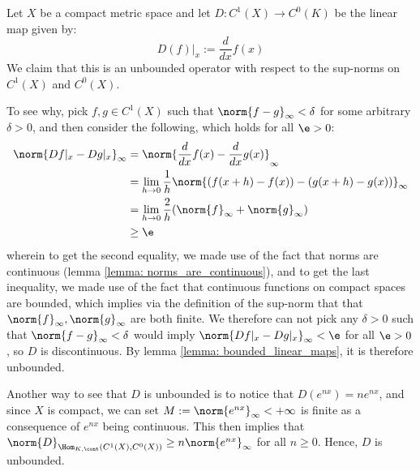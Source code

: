         \begin{example} \label{example: d/dx_is_unbounded}
            Let $X$ be a compact metric space and let $D: C^1(X) \to C^0(K)$ be the linear map given by:
                $$D(f)|_x := \frac{d}{dx} f(x)$$
            We claim that this is an unbounded operator with respect to the sup-norms on $C^1(X)$ and $C^0(X)$.

            To see why, pick $f, g \in C^1(X)$ such that $\norm{f - g}_{\infty} < \delta$ for some arbitrary $\delta > 0$, and then consider the following, which holds for all $\e > 0$:
                $$
                    \begin{aligned}
                        \norm{Df|_x - Dg|_x}_{\infty} & = \norm{ \frac{d}{dx} f(x) - \frac{d}{dx} g(x) }_{\infty}
                        \\
                        & = \lim_{h \to 0} \frac1h \norm{ ( f(x + h) - f(x) ) - ( g(x + h) - g(x) ) }_{\infty}
                        \\
                        & = \lim_{h \to 0} \frac2h ( \norm{f}_{\infty} + \norm{g}_{\infty} )
                        \\
                        & \geq \e
                    \end{aligned}
                $$
            wherein to get the second equality, we made use of the fact that norms are continuous (lemma \ref{lemma: norms_are_continuous}), and to get the last inequality, we made use of the fact that continuous functions on compact spaces are bounded, which implies via the definition of the sup-norm that that $\norm{f}_{\infty}, \norm{g}_{\infty}$ are both finite. We therefore can not pick any $\delta > 0$ such that $\norm{f - g}_{\infty} < \delta$ would imply $\norm{Df|_x - Dg|_x}_{\infty} < \e$ for all $\e > 0$, so $D$ is discontinuous. By lemma \ref{lemma: bounded_linear_maps}, it is therefore unbounded.

            Another way to see that $D$ is unbounded is to notice that $D(e^{n x}) = n e^{n x}$, and since $X$ is compact, we can set $M := \norm{e^{n x}}_{\infty} < +\infty$ is finite as a consequence of $e^{n x}$ being continuous. This then implies that $\norm{D}_{\Hom_{K, \cont}(C^1(X), C^0(X))} \geq n \norm{e^{n x}}_{\infty}$ for all $n \geq 0$. Hence, $D$ is unbounded.
        \end{example}
    
